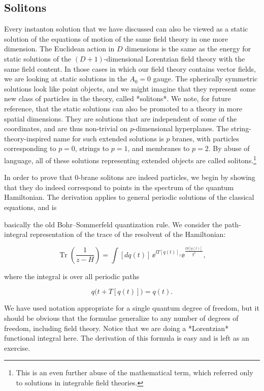 \subsection{Solitons}

Every instanton solution that we have discussed can also be viewed as a static
solution of the equations of motion of the same field theory in one more
dimension. The Euclidean action in $D$ dimensions is the same as the energy for
static solutions of the $(D+1)$-dimensional Lorentzian field theory
with the same field content. In those cases in which our field theory contains
vector fields, we are looking at static solutions in the $A_0=0$ gauge. The
spherically symmetric solutions look like point objects, and we might imagine
that they represent some new class of particles in the theory, called
*solitons*. We note, for future reference, that the static solutions can also be
promoted to a theory in more spatial dimensions. They are solutions that are
independent of some of the coordinates, and are thus non-trivial on
$p$-dimensional hyperplanes. The string-theory-inspired name for such extended
solutions is $p$ branes, with particles corresponding to $p=0$, strings to
$p=1$, and membranes to $p=2$. By abuse of language, all of these solutions
representing extended objects are called solitons.\footnote[10]{This is an
even further abuse of the mathematical term, which referred only to solutions
in integrable field theories.}

In order to prove that 0-brane solitons are indeed particles, we begin by
showing that they do indeed correspond to points in the spectrum of the quantum
Hamiltonian. The derivation applies to general periodic solutions of the
classical equations, and is

basically the old Bohr--Sommerfeld quantization rule. We consider the
path-integral representation of the trace of the resolvent of the Hamiltonian:

\[
  \operatorname{Tr}\left(\frac{1}{z-H}\right)
  =\int[dq(t)]\,\ee^{\ii T[q(t)]_z}
  \ee^{\frac{\ii S[q(t)]}{g^2}},
\]

where the integral is over all periodic paths

\[
  q\bigl(t+T[q(t)]\bigr)=q(t).
\]

We have used notation appropriate for a single quantum degree of freedom, but it
should be obvious that the formulae generalize to any number of degrees of
freedom, including field theory. Notice that we are doing a *Lorentzian*
functional integral here. The derivation of this formula is easy and is left as
an exercise.

